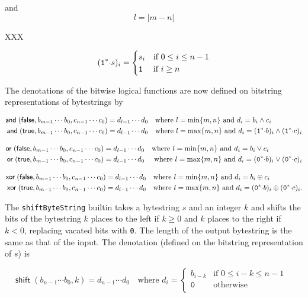 and 
$$
 l=\left|m-n\right|
$$


XXX

$$
(\mathtt{1}^*{\cdot}s)_i =
\begin{cases}
  s_i & \text{if $0 \leq i \leq n-1$}\\
  \mathtt{1} & \text{if $i \geq n$}
\end{cases}
$$

\noindent The denotations of the bitwise logical functions are now defined on
bitstring representations of bytestrings by

\begin{align*}
\mathsf{and}\;(\mathsf{false}, b_{m-1} \cdots b_0, c_{n-1} \cdots c_0) &= d_{l-1} \cdots d_0 
\quad \text{where $l=\min\{m,n\}$ and $d_i = b_i \wedge c_i$}\\
\mathsf{and}\;(\mathsf{true}, b_{m-1} \cdots b_0, c_{n-1} \cdots c_0) &= d_{l-1} \cdots d_0
\quad \text{where $l=\max\{m,n\}$ and $d_i = (\mathtt{1}^*{\cdot}b)_i \wedge(\mathtt{1}^*{\cdot}c)_i$}
\end{align*}


\begin{align*}
\mathsf{or}\;(\mathsf{false}, b_{m-1} \cdots b_0, c_{n-1} \cdots c_0) &= d_{l-1} \cdots d_0
  \quad \text{where $l=\min\{m,n\}$ and $d_i = b_i \vee c_i$}\\
\mathsf{or}\;(\mathsf{true}, b_{m-1} \cdots b_0, c_{n-1} \cdots c_0) &= d_{l-1} \cdots d_0 
\quad \text{ where $l=\max\{m,n\}$ and $d_i = (\mathtt{0}^*{\cdot}b)_i \vee (\mathtt{0}^*{\cdot}c)_i$}
\end{align*}


\begin{align*}
\mathsf{xor}\;(\mathsf{false}, b_{m-1} \cdots b_0, c_{n-1} \cdots c_0) &= d_{l-1} \cdots d_0 
\quad \text{where $l=\min\{m,n\}$ and $d_i = b_i \oplus c_i$}\\
\mathsf{xor}\;(\mathsf{true}, b_{m-1} \cdots b_0, c_{n-1} \cdots c_0) &= d_{l-1} \cdots d_0 
\quad \text{where $l=\max\{m,n\}$ and $d_i = (\mathtt{0}^*{\cdot}b)_i \oplus (\mathtt{0}^*{\cdot}c)_i$.}
\end{align*}


\label{note:shift}
The \texttt{shiftByteString} builtin takes a bytestring $s$ and an integer $k$ and
shifts the bits of the bytestring $k$ places to the left if $k \geq 0$ and $k$
places to the right if $k < 0$, replacing vacated bits with \texttt{0}.  The
length of the output bytestring is the same as that of the input.  The
denotation (defined on the bitstring representation of $s$) is

$$
\mathsf{shift}\;(b_{n-1} \cdots b_0, k) =
  d_{n-1} \cdots d_0 \quad \text{where }
  d_i = \begin{cases}
     b_{i-k} & \text{if $0 \leq i-k \leq n-1$ }\\
     \texttt{0} & \text{otherwise}\\
\end{cases}
$$

